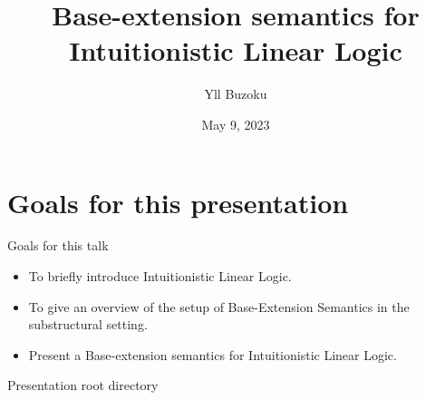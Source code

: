 \documentclass{beamer}
\title[P-tS for ILL]{Base-extension semantics for Intuitionistic Linear Logic}
\author{Yll Buzoku}
\institute[UCL]{%
  Department of Computer Science \\ %
  University College London
}
\date{May 9, 2023}
\begin{document}
\begin{frame}
\titlepage
\end{frame}
\section*{Goals for this presentation}
\begin{frame}{Goals for this talk}
\begin{itemize}[label={-}]
\item To briefly introduce Intuitionistic Linear Logic.
\item To give an overview of the setup of Base-Extension Semantics in the substructural setting.
\item Present a Base-extension semantics for Intuitionistic Linear Logic.
\end{itemize}
\end{frame}
\begin{frame}{Presentation root directory}
\tableofcontents
\end{frame}
\end{document}
